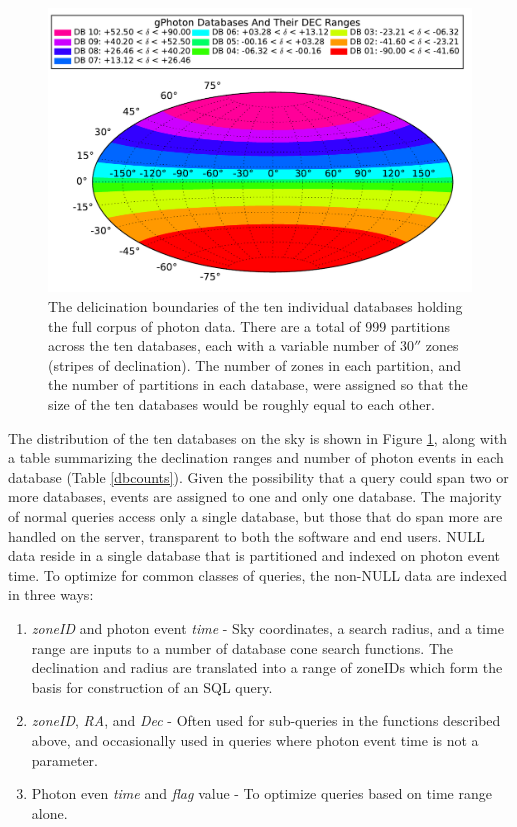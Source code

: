 \documentclass[preprint]{aastex}
\begin{document}
\begin{figure}[h]
\includegraphics[scale=0.9]{Fig01.pdf}
\caption{The delicination boundaries of the ten individual databases holding the full corpus of photon data. There are a total of 999 partitions across the ten databases, each with a variable number of $30''$ zones (stripes of declination).  The number of zones in each partition, and the number of partitions in each database, were assigned so that the size of the ten databases would be roughly equal to each other. \label{dbdist}}
\end{figure}

The distribution of the ten databases on the sky is shown in Figure \ref{dbdist}, along with a table summarizing the declination ranges and number of photon events in each database (Table \ref{dbcounts}). Given the possibility that a query could span two or more databases, events are assigned to one and only one database. The majority of normal queries access only a single database, but those that do span more are handled on the server, transparent to both the software and end users.
	NULL data reside in a single database that is partitioned and indexed on photon event time. To optimize for common classes of queries, the non-NULL data are indexed in three ways:
\begin{enumerate}
	\item{\emph{zoneID} and photon event \emph{time} - Sky coordinates, a search radius, and a time range are inputs to a number of database cone search functions. The declination and radius are translated into a range of zoneIDs which form the basis for construction of an SQL query.}
	\item{\emph{zoneID}, \emph{RA}, and \emph{Dec} - Often used for sub-queries in the functions described above, and occasionally used in queries where photon event time is not a parameter.}
	\item{Photon even \emph{time} and \emph{flag} value - To optimize queries based on time range alone.}
\end{enumerate}
\end{document}
